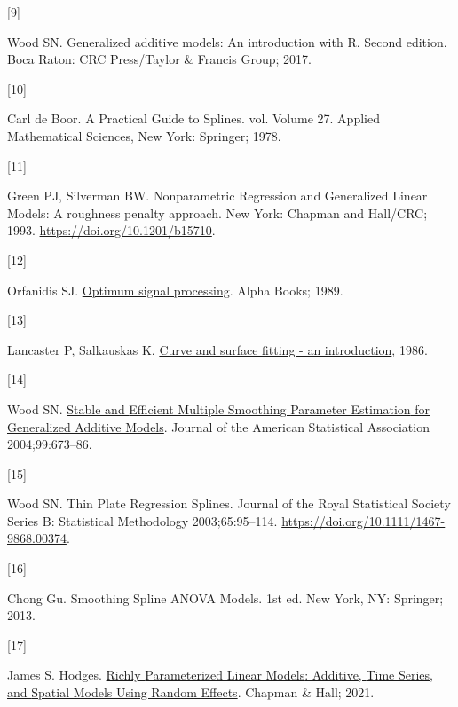 \documentclass[
11pt, %
oneside, %
english, %
singlespacing, %
]{macthesis} %
\newlength{\cslhangindent}
\newlength{\csllabelwidth}
\newenvironment{CSLReferences}[2] %
{\begin{list}{}{%
	\setlength{\itemindent}{0pt}
	\setlength{\leftmargin}{0pt}
	\setlength{\parsep}{0pt}
	\ifodd #1
	\setlength{\leftmargin}{\cslhangindent}
	\setlength{\itemindent}{-1\cslhangindent}
	\fi
	\setlength{\itemsep}{#2\baselineskip}}}
{\end{list}}
\newcommand{\CSLLeftMargin}[1]{\parbox[t]{\csllabelwidth}{\strut#1\strut}}
\newcommand{\CSLRightInline}[1]{\parbox[t]{\linewidth - \csllabelwidth}{\strut#1\strut}}
\begin{document}
\begin{CSLReferences}{0}{0}
\CSLLeftMargin{{[}9{]} }%
\CSLRightInline{Wood SN. Generalized additive models: An introduction with {R}. Second edition. Boca Raton: CRC Press/Taylor \& Francis Group; 2017.}

\CSLLeftMargin{{[}10{]} }%
\CSLRightInline{Carl de Boor. A {Practical Guide} to {Splines}. vol. Volume 27. Applied Mathematical Sciences, New York: Springer; 1978.}

\CSLLeftMargin{{[}11{]} }%
\CSLRightInline{Green PJ, Silverman BW. Nonparametric {Regression} and {Generalized Linear Models}: {A} roughness penalty approach. New York: {Chapman and Hall/CRC}; 1993. \url{https://doi.org/10.1201/b15710}.}

\CSLLeftMargin{{[}12{]} }%
\CSLRightInline{Orfanidis SJ. \href{https://books.google.ca/books?id=rrJ5AAAACAAJ}{Optimum signal processing}. Alpha Books; 1989.}

\CSLLeftMargin{{[}13{]} }%
\CSLRightInline{Lancaster P, Salkauskas K. \href{https://www.semanticscholar.org/paper/Curve-and-surface-fitting-an-introduction-Lancaster-Salkauskas/4a9d7f41851cdec947175a22fde29037a8eabd45}{Curve and surface fitting - an introduction}, 1986.}

\CSLLeftMargin{{[}14{]} }%
\CSLRightInline{Wood SN. \href{https://www.jstor.org/stable/27590439}{Stable and {Efficient Multiple Smoothing Parameter Estimation} for {Generalized Additive Models}}. Journal of the American Statistical Association 2004;99:673--86.}

\CSLLeftMargin{{[}15{]} }%
\CSLRightInline{Wood SN. Thin {Plate Regression Splines}. Journal of the Royal Statistical Society Series B: Statistical Methodology 2003;65:95--114. \url{https://doi.org/10.1111/1467-9868.00374}.}

\CSLLeftMargin{{[}16{]} }%
\CSLRightInline{Chong Gu. Smoothing {Spline ANOVA Models}. 1st ed. New York, NY: Springer; 2013.}

\CSLLeftMargin{{[}17{]} }%
\CSLRightInline{James S. Hodges. \href{https://www.routledge.com/Richly-Parameterized-Linear-Models-Additive-Time-Series-and-Spatial-Models-Using-Random-Effects/Hodges/p/book/9780367533731}{Richly {Parameterized Linear Models}: {Additive}, {Time Series}, and {Spatial Models Using Random Effects}}. Chapman \& Hall; 2021.}


\end{CSLReferences}
\end{document}
